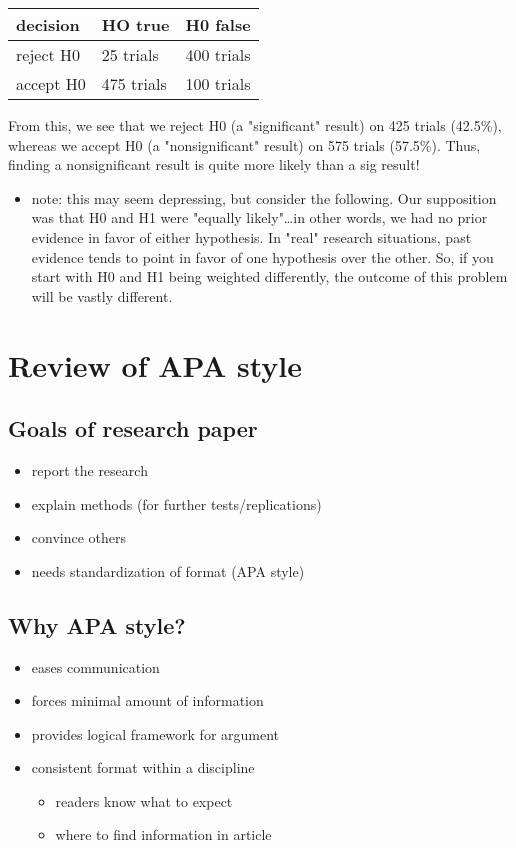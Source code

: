 \documentclass[11pt]{article}
\begin{document}
\begin{center}
\begin{tabular}{lll}
decision & HO true & H0 false\\
\hline
reject H0 & 25 trials & 400 trials\\
accept H0 & 475 trials & 100 trials\\
\end{tabular}
\end{center}

From this, we see that we reject H0 (a "significant" result) on 425 trials (42.5\%), whereas we accept H0 (a "nonsignificant" result) on 575 trials (57.5\%).  Thus, finding a nonsignificant result is quite more likely than a sig result!

\begin{itemize}
\item note: this may seem depressing, but consider the following.  Our supposition was that H0 and H1 were "equally likely"\ldots{}in other words, we had no prior evidence in favor of either hypothesis.  In "real" research situations, past evidence tends to point in favor of one hypothesis over the other.  So, if you start with H0 and H1 being weighted differently, the outcome of this problem will be vastly different.
\end{itemize}
\section*{Review of APA style}
\label{sec-2}
\subsection*{Goals of research paper}
\label{sec-2-1}
\begin{itemize}
\item report the research
\item explain methods (for further tests/replications)
\item convince others
\item needs standardization of format (APA style)
\end{itemize}

\subsection*{Why APA style?}
\label{sec-2-2}
\begin{itemize}
\item eases communication
\item forces minimal amount of information
\item provides logical framework for argument
\item consistent format within a discipline
\begin{itemize}
\item readers know what to expect
\item where to find information in article
\end{itemize}
\end{itemize}
\end{document}
